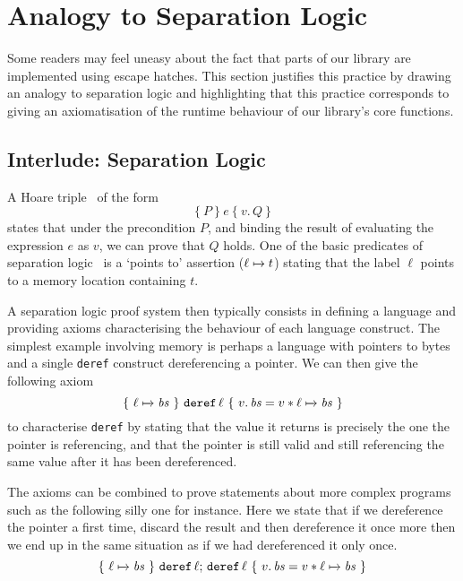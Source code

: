 \section{Analogy to Separation Logic}\label{appendix:hoare}

Some readers may feel uneasy about the fact that parts of our
library are implemented using \idris{} escape hatches.
%
This section justifies this practice by drawing an analogy to
separation logic and highlighting that this practice corresponds
to giving an axiomatisation of the runtime behaviour of our
library's core functions.

\newcommand{\Pointer}[3]{\ensuremath{#1 \xmapsto{#2} #3}}
\newcommand{\Hoare}[4]{\ensuremath{\lbrace~ #1 ~\rbrace~ #2 ~\lbrace~ #3.\, #4 ~\rbrace}}
\newcommand{\Meaning}[2]{\ensuremath{\llbracket \,#1\, \rrbracket\, (\Mu{#2})}}
\newcommand{\Mu}[1]{\ensuremath{\mu \, \mathit{#1}}}

\subsection{Interlude: Separation Logic}

A Hoare triple~\cite{DBLP:journals/cacm/Hoare69} of the form
\[ \Hoare{P}{e}{v}{Q} \]
states that under the precondition
$P$, and binding the result of evaluating the expression $e$ as $v$,
we can prove that $Q$ holds.
%
One of the basic predicates of separation logic~\cite{DBLP:conf/lics/Reynolds02}
is a `points to' assertion (\Pointer{\ell}{}{t}) stating that
the label $\ell$ points to a memory location containing $t$.

A separation logic proof system then typically consists in defining
a language and providing axioms characterising the behaviour of
each language construct.
%
The simplest example involving memory is perhaps a language
with pointers to bytes and a single \texttt{deref} construct
dereferencing a pointer.
%
We can then give the following axiom
\[ \Hoare{\Pointer{\ell}{}{\mathit{bs}}}{\texttt{deref}\,\ell}{v}{\mathit{bs} = v \ast \Pointer{\ell}{}{\mathit{bs}}} \]
to characterise \texttt{deref} by stating that the value
it returns is precisely the one the pointer is referencing,
and that the pointer is still valid and still referencing
the same value after it has been dereferenced.

The axioms can be combined to prove statements about more
complex programs such as the following silly one for instance.
Here we state that if we dereference the pointer a first time,
discard the result and then dereference it once more then we
end up in the same situation as if we had dereferenced it only once.
\[ \Hoare{\Pointer{\ell}{}{\mathit{bs}}}{\texttt{deref}\,\ell;\, \texttt{deref}\,\ell}{v}{\mathit{bs} = v \ast \Pointer{\ell}{}{\mathit{bs}}} \]

